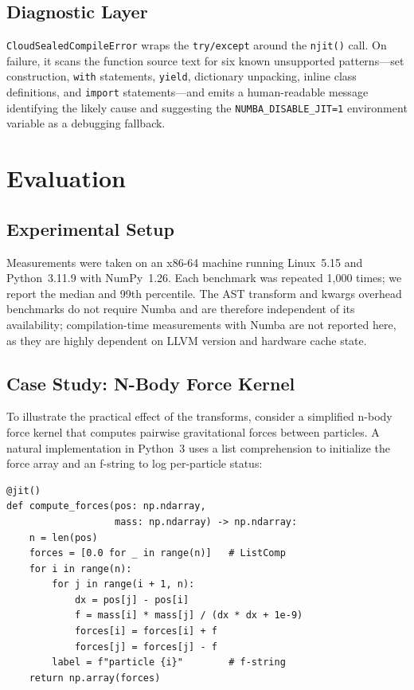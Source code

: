 \documentclass[journal]{IEEEtran}
\begin{document}
\subsection{Diagnostic Layer}

\texttt{CloudSealedCompileError} wraps the \texttt{try/except} around the
\texttt{njit()} call. On failure, it scans the function source text for six
known unsupported patterns—set construction, \texttt{with} statements,
\texttt{yield}, dictionary unpacking, inline class definitions, and
\texttt{import} statements—and emits a human-readable message identifying
the likely cause and suggesting the \texttt{NUMBA\_DISABLE\_JIT=1}
environment variable as a debugging fallback.

\section{Evaluation}

\subsection{Experimental Setup}

Measurements were taken on an x86-64 machine running Linux~5.15 and
Python~3.11.9 with NumPy~1.26. Each benchmark was repeated 1,000 times;
we report the median and 99th percentile. The AST transform and kwargs
overhead benchmarks do not require Numba and are therefore independent of
its availability; compilation-time measurements with Numba are not reported
here, as they are highly dependent on LLVM version and hardware cache state.

\subsection{Case Study: N-Body Force Kernel}

To illustrate the practical effect of the transforms, consider a simplified
n-body force kernel that computes pairwise gravitational forces between
particles. A natural implementation in Python~3 uses a list comprehension
to initialize the force array and an f-string to log per-particle status:

\begin{lstlisting}[style=python, caption={N-body kernel as written by the developer.}, label={lst:nbody}]
@jit()
def compute_forces(pos: np.ndarray,
                   mass: np.ndarray) -> np.ndarray:
    n = len(pos)
    forces = [0.0 for _ in range(n)]   # ListComp
    for i in range(n):
        for j in range(i + 1, n):
            dx = pos[j] - pos[i]
            f = mass[i] * mass[j] / (dx * dx + 1e-9)
            forces[i] = forces[i] + f
            forces[j] = forces[j] - f
        label = f"particle {i}"        # f-string
    return np.array(forces)
\end{lstlisting}
\end{document}
